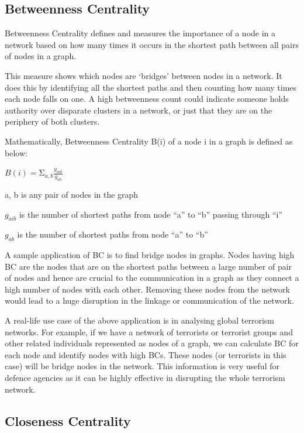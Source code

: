 \documentclass[12pt, a4paper]{article}
\begin{document}
    \subsection{Betweenness Centrality}

    \begin{flushleft}
    Betweenness Centrality defines and measures the importance of a node in a network based on how many times it occurs in the shortest path between all pairs of nodes in a graph.
    
    This measure shows which nodes are ‘bridges’ between nodes in a network. It does this by identifying all the shortest paths and then counting how many times each node falls on one. A high betweenness count could indicate someone holds authority over disparate clusters in a network, or just that they are on the periphery of both clusters.
    
    Mathematically, Betweenness Centrality B(i) of a node i in a graph is defined as below:

    $ B\left(i\right)=\mathrm{\Sigma}_{a,b}\frac{g_{aib}}{g_{ab}} $

    a, b is any pair of nodes in the graph
   
    $g_{aib}$ is the number of shortest paths from node “a” to “b” passing through “i”
    
    $g_{ab}$ is the number of shortest paths from node “a” to “b”

    A sample application of BC is to find bridge nodes in graphs. Nodes having high BC are the nodes that are on the shortest paths between a large number of pair of nodes and hence are crucial to the communication in a graph as they connect a high number of nodes with each other. Removing these nodes from the network would lead to a huge disruption in the linkage or communication of the network.

    A real-life use case of the above application is in analysing global terrorism networks. For example, if we have a network of terrorists or terrorist groups and other related individuals represented as nodes of a graph, we can calculate BC for each node and identify nodes with high BCs. These nodes (or terrorists in this case) will be bridge nodes in the network. This information is very useful for defence agencies as it can be highly effective in disrupting the whole terrorism network. 
    \end{flushleft}
    \subsection{Closeness Centrality}
\end{document}
